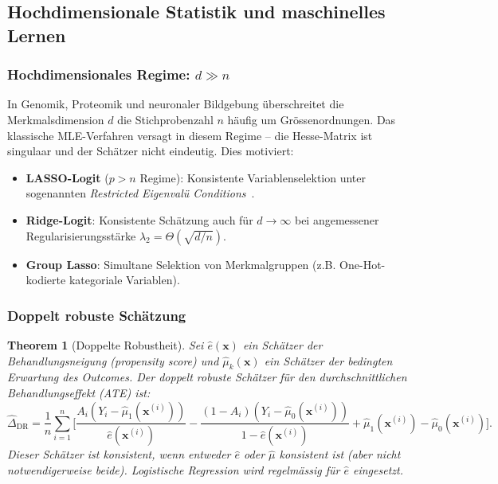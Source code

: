 ﻿\documentclass[12pt, a4paper]{article}
\newtheorem{theorem}{Theorem}[section]
\theoremstyle{definition}
\theoremstyle{remark}
\newcommand{\vx}{\bm{x}}
\begin{document}
\subsection{Hochdimensionale Statistik und maschinelles Lernen}

\subsubsection{Hochdimensionales Regime: $d \gg n$}

In Genomik, Proteomik und neuronaler Bildgebung überschreitet die Merkmalsdimension $d$
die Stichprobenzahl $n$ häufig um Grössenordnungen. Das klassische MLE-Verfahren versagt
in diesem Regime -- die Hesse-Matrix ist singulaar und der Schätzer nicht eindeutig. Dies
motiviert:

\begin{itemize}
  \item \textbf{LASSO-Logit} ($p > n$ Regime): Konsistente Variablenselektion unter
    sogenannten \emph{Restricted Eigenvalü Conditions}~\citep{bickel2009simultaneous}.
  \item \textbf{Ridge-Logit}: Konsistente Schätzung auch für $d \to \infty$ bei angemessener
    Regularisierungsstärke $\lambda_2 = \Theta(\sqrt{d/n})$.
  \item \textbf{Group Lasso}: Simultane Selektion von Merkmalgruppen (z.B. One-Hot-kodierte
    kategoriale Variablen).
\end{itemize}

\subsubsection{Doppelt robuste Schätzung}

\begin{theorem}[Doppelte Robustheit]
  Sei $\hat{e}(\vx)$ ein Schätzer der Behandlungsneigung (propensity score) und
  $\hat{\mu}_k(\vx)$ ein Schätzer der bedingten Erwartung des Outcomes. Der \emph{doppelt
  robuste} Schätzer für den durchschnittlichen Behandlungseffekt (ATE) ist:
  \[
    \hat{\Delta}_{\mathrm{DR}}
    = \frac{1}{n}\sum_{i=1}^n \biggl[\frac{A_i(Y_i-\hat{\mu}_1(\vx^{(i)}))}{\hat{e}(\vx^{(i)})}
    - \frac{(1-A_i)(Y_i-\hat{\mu}_0(\vx^{(i)}))}{1-\hat{e}(\vx^{(i)})} + \hat{\mu}_1(\vx^{(i)}) - \hat{\mu}_0(\vx^{(i)})\biggr].
  \]
  Dieser Schätzer ist konsistent, wenn \emph{entweder} $\hat{e}$ \emph{oder} $\hat{\mu}$
  konsistent ist (aber nicht notwendigerweise beide). Logistische Regression wird regelmässig
  für $\hat{e}$ eingesetzt.
\end{theorem}
\end{document}
